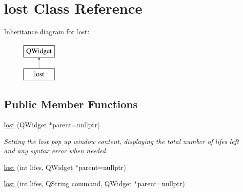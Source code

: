 \hypertarget{classlost}{\section{lost Class Reference}
\label{classlost}
}
Inheritance diagram for lost\-:\begin{figure}[H]
\begin{center}
\leavevmode
\includegraphics[height=2.000000cm]{classlost}
\end{center}
\end{figure}
\subsection*{Public Member Functions}
\begin{DoxyCompactItemize}
\item 
\hypertarget{classlost_ab0f3e550330f6431091188db0a27d559}{\hyperlink{classlost_ab0f3e550330f6431091188db0a27d559}{lost} (Q\-Widget $\ast$parent=nullptr)}\label{classlost_ab0f3e550330f6431091188db0a27d559}

\begin{DoxyCompactList}\small\item\em Setting the lost pop up window content, displaying the total number of lifes left and any syntax error when needed. \end{DoxyCompactList}\item 
\hyperlink{classlost_ac722377b01564776ab8f9e3b4ae000ce}{lost} (int lifes, Q\-Widget $\ast$parent=nullptr)
\item 
\hyperlink{classlost_ab4341492387749792920ce0e93cb7684}{lost} (int lifes, Q\-String command, Q\-Widget $\ast$parent=nullptr)
\end{DoxyCompactItemize}


